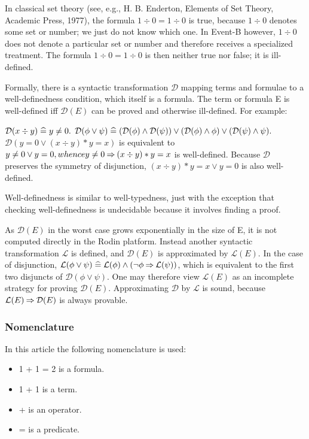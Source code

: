 In classical set theory (see, e.g., H. B. Enderton, Elements of Set Theory, Academic Press, 1977), the formula $1\div 0 = 1\div 0$ is true, because $1\div 0$ denotes some set or number; we just do not know which one. In Event-B however, $1\div 0$ does not denote a particular set or number and therefore receives a specialized treatment. The formula $1\div 0 = 1\div 0$ is then neither true nor false; it is ill-defined.

Formally, there is a syntactic transformation $\mathcal{D}$ mapping terms and formulae to a well-definedness condition, which itself is a formula. The term or formula E is well-defined iff $\mathcal{D}(E)$ can be proved and otherwise ill-defined. For example:

    $\mathcal{D}(x\div y) \mathrel{\widehat=} y \neq 0.$
    $\mathcal{D}(\phi\lor\psi)\mathrel{\widehat=}(\mathcal{D}(\phi)\land\mathcal{D}(\psi))\lor(\mathcal{D}(\phi)\land\phi)\lor(\mathcal{D}(\psi)\land\psi).$
    $\mathcal{D}(y=0 \lor (x\div y) * y = x)$ is equivalent to $y\neq0 \lor y = 0, whence y\neq0\mathbin\Rightarrow(x\div y)*y=x$ is well-defined.
    Because $\mathcal{D}$ preserves the symmetry of disjunction, $(x\div y)*y=x \lor y = 0$ is also well-defined. 

Well-definedness is similar to well-typedness, just with the exception that checking well-definedness is undecidable because it involves finding a proof.

As $\mathcal{D}(E)$ in the worst case grows exponentially in the size of E, it is not computed directly in the Rodin platform. Instead another syntactic transformation $\mathcal{L}$ is defined, and $\mathcal{D}(E)$ is approximated by $\mathcal{L}(E)$. In the case of disjunction, $\mathcal{L}(\phi\lor\psi)\mathrel{\widehat=}\mathcal{L}(\phi)\land(\lnot\phi\mathbin\Rightarrow\mathcal{L}(\psi))$, which is equivalent to the first two disjuncts of $\mathcal{D}(\phi\lor\psi)$. One may therefore view $\mathcal{L}(E)$ as an incomplete strategy for proving $\mathcal{D}(E)$. Approximating $\mathcal{D}$ by $\mathcal{L}$ is sound, because $\mathcal{L}(E)\mathbin\Rightarrow\mathcal{D}(E)$ is always provable. 

\subsubsection{Nomenclature}

In this article the following nomenclature is used:

\begin{itemize}
    \item 1 + 1 = 2 is a formula.
    \item 1 + 1 is a term.
    \item + is an operator.
    \item = is a predicate. 
\end{itemize}

